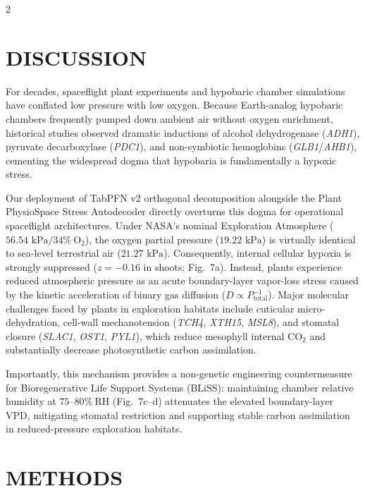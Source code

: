 \documentclass[10pt,a4paper]{article}
\begin{document}
\begin{multicols}{2}

\section*{DISCUSSION}
For decades, spaceflight plant experiments and hypobaric chamber simulations have conflated low pressure with low oxygen\cite{corey1997hypobaric, paul2004hypobaric, paul2006spaceflight, richards2006hypobaric}. Because Earth-analog hypobaric chambers frequently pumped down ambient air without oxygen enrichment, historical studies observed dramatic inductions of alcohol dehydrogenase (\textit{ADH1}), pyruvate decarboxylase (\textit{PDC1}), and non-symbiotic hemoglobins (\textit{GLB1}/\textit{AHB1}), cementing the widespread dogma that hypobaria is fundamentally a hypoxic stress\cite{paul2004hypobaric, zhou2017dissecting}.

Our deployment of TabPFN v2 orthogonal decomposition alongside the Plant PhysioSpace Stress Autodecoder directly overturns this dogma for operational spaceflight architectures. Under NASA's nominal Exploration Atmosphere ($56.54\text{ kPa} / 34\%\ \text{O}_2$), the oxygen partial pressure ($19.22\text{ kPa}$) is virtually identical to sea-level terrestrial air ($21.27\text{ kPa}$). Consequently, internal cellular hypoxia is strongly suppressed ($z = -0.16$ in shoots; Fig.~7a). Instead, plants experience reduced atmospheric pressure as an acute boundary-layer vapor-loss stress caused by the kinetic acceleration of binary gas diffusion ($D \propto P_{\text{total}}^{-1}$). Major molecular challenges faced by plants in exploration habitats include cuticular micro-dehydration, cell-wall mechanotension (\textit{TCH4}, \textit{XTH15}, \textit{MSL8}), and stomatal closure (\textit{SLAC1}, \textit{OST1}, \textit{PYL1}), which reduce mesophyll internal $\text{CO}_2$ and substantially decrease photosynthetic carbon assimilation.

Importantly, this mechanism provides a non-genetic engineering countermeasure for Bioregenerative Life Support Systems (BLiSS): maintaining chamber relative humidity at $75\text{--}80\%\ \text{RH}$ (Fig.~7c--d) attenuates the elevated boundary-layer VPD, mitigating stomatal restriction and supporting stable carbon assimilation in reduced-pressure exploration habitats.

\section*{METHODS}

\end{multicols}
\end{document}
